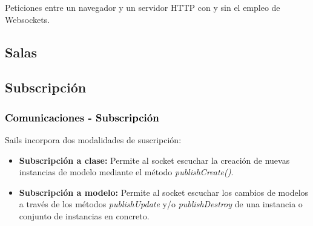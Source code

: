 \documentclass[xcolor=x11names,compress]{beamer}
\theoremstyle{cuadrado}
\begin{document}
{{\begin{center}
  Peticiones entre un navegador y un servidor HTTP con y sin el empleo de Websockets.
\end{center}
 
}

\subsection{Salas}



\subsection{Subscripción}

\begin{frame}[fragile]
\frametitle{\textcolor{black}{ Comunicaciones - Subscripción}}
Sails incorpora dos modalidades de suscripción:

\begin{itemize}
 \item \textbf{ Subscripción a clase:} Permite al socket escuchar la creación de nuevas instancias de modelo mediante el método \emph{publishCreate()}. 
 \item \textbf{Subscripción a modelo:} Permite al socket escuchar los cambios de modelos a través de los métodos \emph{publishUpdate} y/o \emph{publishDestroy} de una instancia o conjunto de instancias en concreto.
\end{itemize}


\end{frame}}
\end{document}
